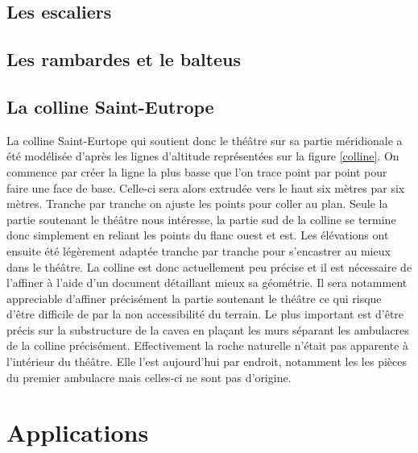 \section{Les escaliers} 

\section{Les rambardes et le \gls{balteus}} 

\section{La colline Saint-Eutrope} 
La colline Saint-Eurtope qui soutient donc le théâtre sur sa partie méridionale a été modélisée d'après les lignes d'altitude représentées sur la figure \ref{colline}. On commence par créer la ligne la plus basse que l'on trace point par point pour faire une face de base. Celle-ci sera alors extrudée vers le haut six mètres par six mètres. Tranche par tranche on ajuste les points pour coller au plan. Seule la partie soutenant le théâtre nous intéresse, la partie sud de la colline se termine donc simplement en reliant les points du flanc ouest et est. Les élévations ont ensuite été légèrement adaptée tranche par tranche pour s'encastrer au mieux dans le théâtre. La colline est donc actuellement peu précise et il est nécessaire de l'affiner à l'aide d'un document détaillant mieux sa géométrie. Il sera notamment appreciable d'affiner précisément la partie soutenant le théâtre ce qui risque d'être difficile de par la non accessibilité du terrain. Le plus important est d'être précis sur la substructure de la cavea en plaçant les murs séparant les ambulacres de la colline précisément. Effectivement la roche naturelle n'était pas apparente à l'intérieur du théâtre. Elle l'est aujourd'hui par endroit, notamment les les pièces du premier ambulacre mais celles-ci ne sont pas d'origine.

		
\chapter{Applications}
	\minitoc
	\newpage
		

